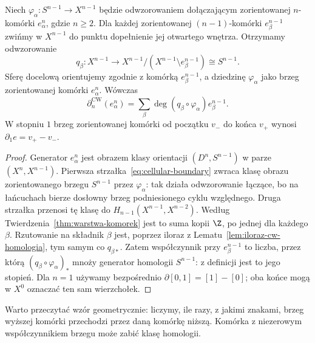 \begin{twierdzenie}
\label{thm:formula-komorkowa}
Niech $\varphi_\alpha:S^{n-1}\to X^{n-1}$
będzie odwzorowaniem dołączającym
zorientowanej $n$-komórki
$e_\alpha^n$, gdzie $n\geq2$.
Dla każdej zorientowanej
$(n-1)$-komórki $e_\beta^{n-1}$
zwińmy w $X^{n-1}$ do punktu
dopełnienie jej otwartego wnętrza.
Otrzymamy odwzorowanie
\[
 q_\beta:X^{n-1}\longrightarrow
 X^{n-1}/(X^{n-1}\setminus e_\beta^{n-1})
 \cong S^{n-1}.
\]
Sferę docelową orientujemy zgodnie z komórką $e_\beta^{n-1}$,
a dziedzinę $\varphi_\alpha$ jako brzeg zorientowanej komórki $e_\alpha^n$.
Wówczas
\begin{equation}\label{eq:formula-komorkowa}
 \partial_n^{\mathrm{CW}}(e_\alpha^n)
 =\sum_{\beta}
 \deg(q_\beta\circ\varphi_\alpha)
 e_\beta^{n-1}.
\end{equation}
W stopniu $1$ brzeg zorientowanej
komórki od początku $v_-$ do końca
$v_+$ wynosi $\partial_1e=v_+-v_-$.
\end{twierdzenie}
\begin{proof}
Generator $e_\alpha^n$ jest
obrazem klasy orientacji
$(D^n,S^{n-1})$ w parze
$(X^n,X^{n-1})$. Pierwsza
strzałka~\eqref{eq:cellular-boundary}
zwraca klasę obrazu
zorientowanego brzegu $S^{n-1}$
przez $\varphi_\alpha$:
tak działa odwzorowanie łączące,
bo na łańcuchach bierze
dosłowny brzeg podniesionego
cyklu względnego.
Druga strzałka przenosi tę
klasę do
$H_{n-1}(X^{n-1},X^{n-2})$.
Według
Twierdzenia~\ref{thm:warstwa-komorek}
jest to suma kopii $\Z$,
po jednej dla każdego $\beta$.
Rzutowanie na składnik $\beta$
jest, poprzez iloraz z
Lematu~\ref{lem:iloraz-cw-homologia},
tym samym co $q_{\beta*}$.
Zatem współczynnik przy
$e_\beta^{n-1}$ to liczba,
przez którą
$(q_\beta\circ\varphi_\alpha)_*$
mnoży generator homologii
$S^{n-1}$: z definicji
jest to jego stopień.
Dla $n=1$ używamy
bezpośrednio
$\partial[0,1]=[1]-[0]$;
oba końce mogą w $X^0$
oznaczać ten sam wierzchołek.
\end{proof}

Warto przeczytać wzór geometrycznie:
liczymy, ile razy, z jakimi znakami,
brzeg wyższej komórki przechodzi
przez daną komórkę niższą. Komórka
z niezerowym współczynnikiem brzegu
może zabić klasę homologii.

